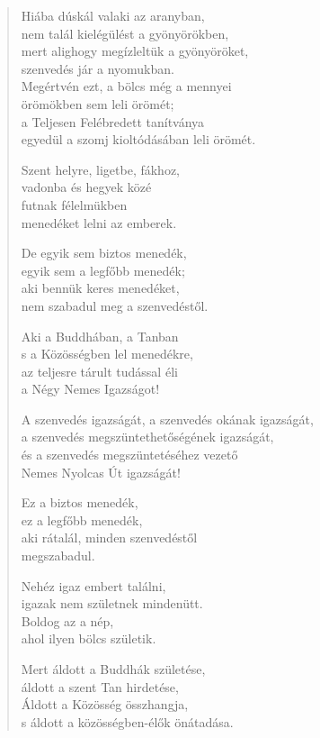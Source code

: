 \begin{verse}
 Hiába dúskál valaki az aranyban,\\
nem talál kielégülést a gyönyörökben,\\
mert alighogy megízleltük a gyönyöröket,\\
szenvedés jár a nyomukban.\\
Megértvén ezt, a bölcs még a mennyei\\
örömökben sem leli örömét;\\
a Teljesen Felébredett tanítványa\\
egyedül a szomj kioltódásában leli örömét.

 Szent helyre, ligetbe, fákhoz,\\
vadonba és hegyek közé\\
futnak félelmükben\\
menedéket lelni az emberek.

 De egyik sem biztos menedék,\\
egyik sem a legfőbb menedék;\\
aki bennük keres menedéket,\\
nem szabadul meg a szenvedéstől.

 Aki a Buddhában, a Tanban\\
s a Közösségben lel menedékre,\\
az teljesre tárult tudással éli\\
a Négy Nemes Igazságot!

 A szenvedés igazságát, a szenvedés okának igazságát,\\
a szenvedés megszüntethetőségének igazságát,\\
és a szenvedés megszüntetéséhez vezető\\
Nemes Nyolcas Út igazságát!

 Ez a biztos menedék,\\
ez a legfőbb menedék,\\
aki rátalál, minden szenvedéstől\\
megszabadul.

 Nehéz igaz embert találni,\\
igazak nem születnek mindenütt.\\
Boldog az a nép,\\
ahol ilyen bölcs születik.

 Mert áldott a Buddhák születése,\\
áldott a szent Tan hirdetése,\\
Áldott a Közösség összhangja,\\
s áldott a közösségben-élők önátadása.


\end{verse}
